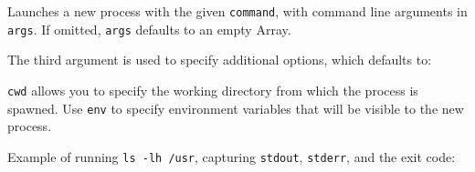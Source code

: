 Launches a new process with the given \texttt{command}, with command
line arguments in \texttt{args}. If omitted, \texttt{args} defaults to
an empty Array.

The third argument is used to specify additional options, which defaults
to:

\begin{Shaded}
\begin{Highlighting}[]
\NormalTok{\{ }\NormalTok{: }\NormalTok{,}
  \NormalTok{: }
\NormalTok{\}}
\end{Highlighting}
\end{Shaded}

\texttt{cwd} allows you to specify the working directory from which the
process is spawned. Use \texttt{env} to specify environment variables
that will be visible to the new process.

Example of running \texttt{ls -lh /usr}, capturing \texttt{stdout},
\texttt{stderr}, and the exit code:

\begin{Shaded}
\begin{Highlighting}[]
 \NormalTok{(}\NormalTok{,}
    \NormalTok{(}\NormalTok{, [}\NormalTok{, }\NormalTok{]);}

\NormalTok{(}\NormalTok{, } 
  \NormalTok{(} 
\NormalTok{\});}

\NormalTok{(}\NormalTok{, } 
  \NormalTok{(} 
\NormalTok{\});}

\NormalTok{(}\NormalTok{, } 
  \NormalTok{(} 
\NormalTok{\});}
\end{Highlighting}
\end{Shaded}

